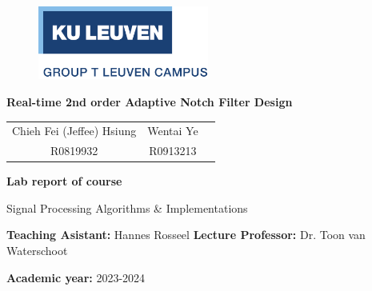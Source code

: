 \begin{titlepage}
\begin{figure}[h]{%
      \includegraphics[width=0.5\textwidth]{Figures/logo.png}
    }
\end{figure}

\vspace*{2cm}

{\Huge  \textbf{Real-time 2nd order Adaptive Notch Filter Design}}

{\raggedleft\vfill{%

%
%
\setlength{\tabcolsep}{12pt} 
\begin{tabular}{c c c}
        {\Large Chieh Fei (Jeffee) Hsiung}  &  {\Large Wentai Ye}  \\
        {R0819932}  & {R0913213}
\end{tabular}
\linebreak
\vspace*{1.5cm}


\textbf{{\large Lab report of course}} \linebreak

{\large Signal Processing Algorithms \& Implementations}\linebreak

\textbf{{\large Teaching Asistant:}}  Hannes Rosseel
\linebreak
\textbf{{\large Lecture Professor:}} Dr. Toon van Waterschoot
\linebreak

\textbf{{\large Academic year:}} {\large 2023-2024}
\linebreak
}\par}

\end{titlepage}
\restoregeometry
\clearpage

